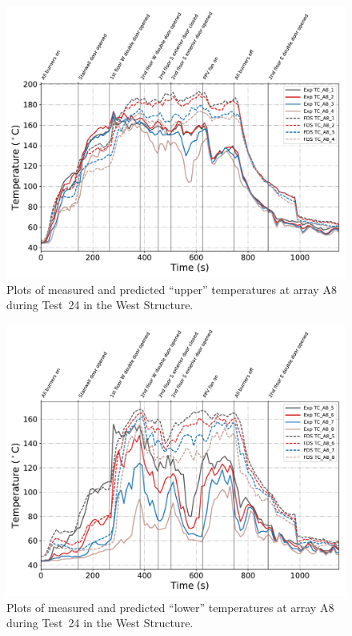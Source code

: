 \begin{figure}[!h]
	\centering
	\includegraphics[width=\columnwidth]{Figures/Plots/Validation/Temperature/Test_24_TC_A8_upper}
	\caption{Plots of measured and predicted ``upper'' temperatures at array A8 during Test~24 in the West Structure.}
	\label{fig:TCA8_upper_data_Test24}
\end{figure}
\begin{figure}[!h]
	\centering
	\includegraphics[width=\columnwidth]{Figures/Plots/Validation/Temperature/Test_24_TC_A8_lower}
	\caption{Plots of measured and predicted ``lower'' temperatures at array A8 during Test~24 in the West Structure.}
	\label{fig:TCA8_lower_data_Test24}
\end{figure}

